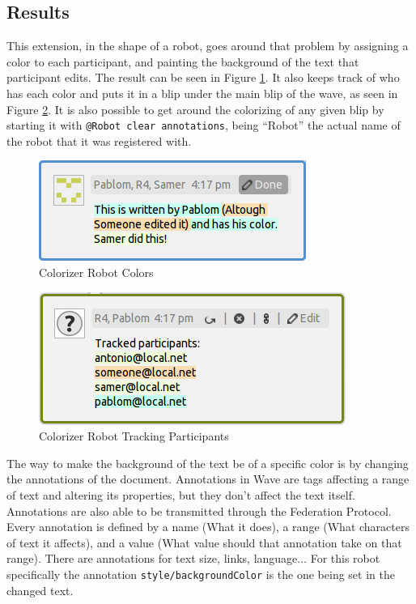 \subsection{Results}
This extension, in the shape of a robot, goes around that problem by assigning a color to each participant, and painting the background of the text that participant edits. The result can be seen in Figure \ref{fig:colorizer_editions}. It also keeps track of who has each color and puts it in a blip under the main blip of the wave, as seen in Figure \ref{fig:colorizer_editors}. It is also possible to get around the colorizing of any given blip by starting it with \verb|@Robot clear annotations|, being ``Robot'' the actual name of the robot that it was registered with.\\[.2cm]
\begin{figure}[H]
  \center
    \includegraphics[keepaspectratio, scale=0.8]{Media/Captures/Extensions/Colorizer/ColorizerEditions.png}
  \caption{Colorizer Robot Colors}
  \label{fig:colorizer_editions}
\end{figure}
\begin{figure}[h]
  \center
    \includegraphics[keepaspectratio, scale=0.7]{Media/Captures/Extensions/Colorizer/ColorizerEditors.png}
  \caption{Colorizer Robot Tracking Participants}
  \label{fig:colorizer_editors}
\end{figure}
The way to make the background of the text be of a specific color is by changing the annotations of the document. Annotations in Wave are tags affecting a range of text and altering its properties, but they don't affect the text itself. Annotations are also able to be transmitted through the Federation Protocol. Every annotation is defined by a name (What it does), a range (What characters of text it affects), and a value (What value should that annotation take on that range). There are annotations for text size, links, language... For this robot specifically the annotation \verb|style/backgroundColor| is the one being set in the changed text.\\[.2cm]
